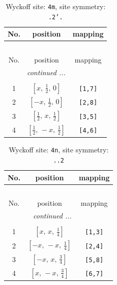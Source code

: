 \documentclass[fleqn,8pt]{jsarticle}
\begin{document}
\renewcommand{\arraystretch}{1.2}
\begin{longtable}{ccc}
\caption{Wyckoff site: {\tt 4m}, site symmetry: {\tt .2'.}}
 \\
 \hline \hline
No. & position & mapping \\ \hline \endfirsthead

\multicolumn{2}{l}{\tablename\ \thetable{}} \\
 \hline \hline
No. & position & mapping \\ \hline \endhead

 \hline \hline
\multicolumn{2}{r}{\footnotesize\it continued ...} \\ \endfoot

 \hline \hline
\multicolumn{2}{r}{} \\ \endlastfoot

1 & $\left[ x,\, \frac{1}{2},\, 0 \right]$ & {\tt [1,7]} \\ \hline
2 & $\left[ - x,\, \frac{1}{2},\, 0 \right]$ & {\tt [2,8]} \\ \hline
3 & $\left[ \frac{1}{2},\, x,\, \frac{1}{2} \right]$ & {\tt [3,5]} \\ \hline
4 & $\left[ \frac{1}{2},\, - x,\, \frac{1}{2} \right]$ & {\tt [4,6]} \\
\end{longtable}
\renewcommand{\arraystretch}{1.2}
\begin{longtable}{ccc}
\caption{Wyckoff site: {\tt 4n}, site symmetry: {\tt ..2}}
 \\
 \hline \hline
No. & position & mapping \\ \hline \endfirsthead

\multicolumn{2}{l}{\tablename\ \thetable{}} \\
 \hline \hline
No. & position & mapping \\ \hline \endhead

 \hline \hline
\multicolumn{2}{r}{\footnotesize\it continued ...} \\ \endfoot

 \hline \hline
\multicolumn{2}{r}{} \\ \endlastfoot

1 & $\left[ x,\, x,\, \frac{1}{4} \right]$ & {\tt [1,3]} \\ \hline
2 & $\left[ - x,\, - x,\, \frac{1}{4} \right]$ & {\tt [2,4]} \\ \hline
3 & $\left[ - x,\, x,\, \frac{3}{4} \right]$ & {\tt [5,8]} \\ \hline
4 & $\left[ x,\, - x,\, \frac{3}{4} \right]$ & {\tt [6,7]} \\
\end{longtable}
\end{document}

